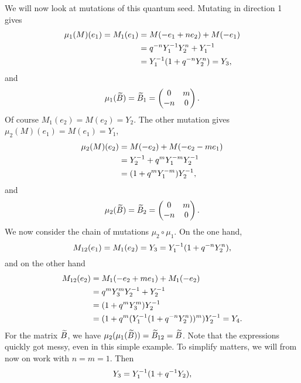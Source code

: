 We will now look at mutations of this quantum seed. Mutating in direction 1 gives
\begin{align*}
	\mu_1(M)(e_1) = M_1(e_1)
	 & = M(-e_1 + n e_2) + M(-e_1)        \\
	 & = q^{-n}Y_1^{-1}Y_2^n + Y_1^{-1}    \\
	 & = Y_1^{-1} (1 + q^{-n}Y_2^n) = Y_3,
\end{align*}
and
\begin{equation*}
	\mu_1(\widetilde{B}) = \widetilde{B}_1 = \begin{pmatrix}
		0  & m \\
		-n & 0
	\end{pmatrix}.
\end{equation*}
%
Of course $M_1(e_2) = M(e_2) = Y_2$. The other mutation gives $\mu_2(M)(e_1) = M(e_1) = Y_1$,
\begin{align*}
	\mu_2(M)(e_2) & = M(-e_2) + M(-e_2 - m e_1)     \\
	              & = Y_2^{-1} + q^m Y_1^{-m}Y_2^{-1} \\
	              & = (1 + q^mY_1^{-m})Y_2^{-1},
\end{align*}
and
\begin{equation*}
	\mu_2(\widetilde{B}) = \widetilde{B}_2 = \begin{pmatrix}
		0  & m \\
		-n & 0
	\end{pmatrix}.
\end{equation*}
%
We now consider the chain of mutations $\mu_2 \circ \mu_1$. On the one hand,
\begin{equation*}
	M_{12}(e_1) = M_1(e_2) = Y_3 = Y_1 ^{-1} (1 + q^{-n}Y_2^n),
\end{equation*}
and on the other hand
\begin{align*}
	M_{12}(e_2)
	 & = M_1(-e_2 + m e_1) + M_1(-e_2)                          \\
	 & = q^{m}Y_3^m Y_2^{-1} + Y_2^{-1}                           \\
	 & = (1 + q^m Y_3^m) Y_2^{-1}                                \\
	 & = (1 + q^m (Y_1 ^{-1} (1 + q^{-n}Y_2^n))^m)Y_2^{-1} = Y_4.
\end{align*}
%
For the matrix $\widetilde{B}$, we have $\mu_2 (\mu_1(\widetilde{B})) = \widetilde{B}_{12} = \widetilde{B}$. Note that the expressions quickly got
messy, even in this simple example. To simplify matters, we will from now on work with
$n = m = 1$. Then
\begin{equation*}
	Y_3 = Y_1^{-1} (1 + q^{-1} Y_2),
\end{equation*}
